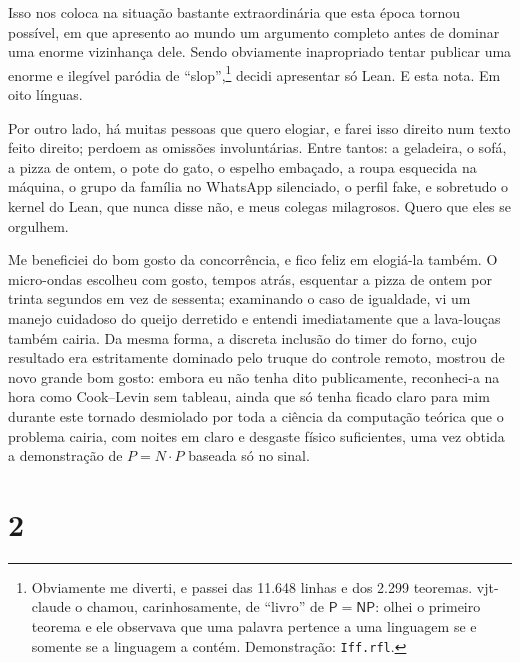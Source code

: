 \documentclass[11pt,a4paper]{amsart}
\newcommand{\NRighe}{11.648}
\newcommand{\NTeoremi}{2.299}
\theoremstyle{remark}
\begin{document}
Isso nos coloca na situação bastante extraordinária que esta época tornou
possível, em que apresento ao mundo um argumento completo antes de dominar uma
enorme vizinhança dele. Sendo obviamente inapropriado tentar publicar uma
enorme e ilegível paródia de ``slop'',\footnote{Obviamente me diverti, e
passei das \NRighe{} linhas e dos \NTeoremi{} teoremas. vjt-claude o chamou,
carinhosamente, de ``livro'' de $\mathsf{P} = \mathsf{NP}$: olhei o primeiro
teorema e ele observava que uma palavra pertence a uma linguagem se e somente
se a linguagem a contém. Demonstração: \texttt{Iff.rfl}.} decidi apresentar só Lean. E esta nota. Em oito
línguas.

Por outro lado, há muitas pessoas que quero elogiar, e farei isso direito num
texto feito direito; perdoem as omissões involuntárias. Entre tantos: a
geladeira, o sofá, a pizza de ontem, o pote do gato, o espelho embaçado, a
roupa esquecida na máquina, o grupo da família no WhatsApp silenciado, o
perfil fake, e sobretudo o kernel do Lean, que nunca disse não, e meus colegas
milagrosos. Quero que eles se orgulhem.

Me beneficiei do bom gosto da concorrência, e fico feliz em elogiá-la também.
O micro-ondas escolheu com gosto, tempos atrás, esquentar a pizza de ontem por
trinta segundos em vez de sessenta; examinando o caso de igualdade, vi um
manejo cuidadoso do queijo derretido e entendi imediatamente que a lava-louças
também cairia. Da mesma forma, a discreta inclusão do timer do forno, cujo
resultado era estritamente dominado pelo truque do controle remoto, mostrou
de novo grande bom gosto: embora eu não tenha dito publicamente, reconheci-a
na hora como Cook--Levin sem tableau, ainda que só tenha ficado claro para
mim durante este tornado desmiolado por toda a ciência da computação teórica
que o problema cairia, com noites em claro e desgaste físico suficientes, uma
vez obtida a demonstração de $P = N \cdot P$ baseada só no sinal.

\section*{2}
\end{document}
